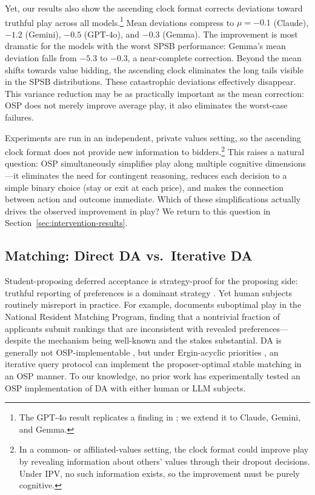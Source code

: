 \documentclass[format=acmsmall, review=false]{acmart}
\begin{document}
Yet, our results also show the ascending clock format corrects deviations toward truthful play across all models.\footnote{The GPT-4o result replicates a finding in \citet{zhu2024evidence}; we extend it to Claude, Gemini, and Gemma.}
Mean deviations compress to $\mu = -0.1$ (Claude), $-1.2$ (Gemini), $-0.5$ (GPT-4o), and $-0.3$ (Gemma). The improvement is most dramatic for the models with the worst SPSB performance: Gemma's mean deviation falls from $-5.3$ to $-0.3$, a near-complete correction. Beyond the mean shifts towards value bidding, the ascending clock eliminates the long tails visible in the SPSB distributions. These catastrophic deviations effectively disappear. This variance reduction may be as practically important as the mean correction: OSP does not merely improve average play, it also eliminates the worst-case failures.

Experiments are run in an independent, private values setting, so the ascending clock format does not provide new information to bidders.\footnote{In a common- or affiliated-values setting, the clock format could improve play by revealing information about others' values through their dropout decisions. Under IPV, no such information exists, so the improvement must be purely cognitive.} This raises a natural question: OSP simultaneously simplifies play along multiple cognitive dimensions---it eliminates the need for contingent reasoning, reduces each decision to a simple binary choice (stay or exit at each price), and makes the connection between action and outcome immediate. Which of these simplifications actually drives the observed improvement in play? We return to this question in Section~\ref{sec:intervention-results}.

\subsection{Matching: Direct DA vs.\ Iterative DA} \label{sec:osp-da}

Student-proposing deferred acceptance is strategy-proof for the proposing side: truthful reporting of preferences is a dominant strategy \citep{roth1982economics}. Yet human subjects routinely misreport in practice. For example, \citet{rees2018suboptimal} documents suboptimal play in the National Resident Matching Program, finding that a nontrivial fraction of applicants submit rankings that are inconsistent with revealed preferences---despite the mechanism being well-known and the stakes substantial. DA is generally not OSP-implementable \citep{ashlagi2018stable}, but under Ergin-acyclic priorities \citep{ergin2002efficient}, an iterative query protocol can implement the proposer-optimal stable matching in an OSP manner. To our knowledge, no prior work has experimentally tested an OSP implementation of DA with either human or LLM subjects.
\end{document}
